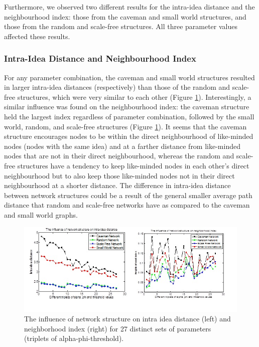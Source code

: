 Furthermore, we observed two different results for the intra-idea distance and the neighbourhood index: those from the caveman and small world structures, and those from the random and scale-free structures. All three parameter values affected these results. 


\subsubsection{Intra-Idea Distance and Neighbourhood Index}

For any parameter combination, the caveman and small world structures resulted in larger intra-idea distances (respectively) than those of the random and scale-free structures, which were very similar to each other (Figure \ref{fig1}). Interestingly, a similar influence was found on the neighbourhood index: the caveman structure held the largest index regardless of parameter combination, followed by the small world, random, and scale-free structures (Figure \ref{fig1}). It seems that the caveman structure encourages nodes to be within the direct neighbourhood of like-minded nodes (nodes with the same idea) and at a farther distance from like-minded nodes that are not in their direct neighbourhood, whereas the random and scale-free structures have a tendency to keep like-minded nodes in each other's direct neighbourhood but to also keep those like-minded nodes not in their direct neighbourhood at a shorter distance. The difference in intra-idea distance between network structures could be a result of the general smaller average path distance that random and scale-free networks have as compared to the caveman and small world graphs.

\begin{figure}
[htp]
\begin{center}
\includegraphics{Fig1}
\end{center}
\caption{The influence of network structure on intra idea distance (left) and neighborhood index (right) for 27 distinct sets of parameters (triplets of alpha-phi-threshold).}
\label {fig1}
\end{figure}


